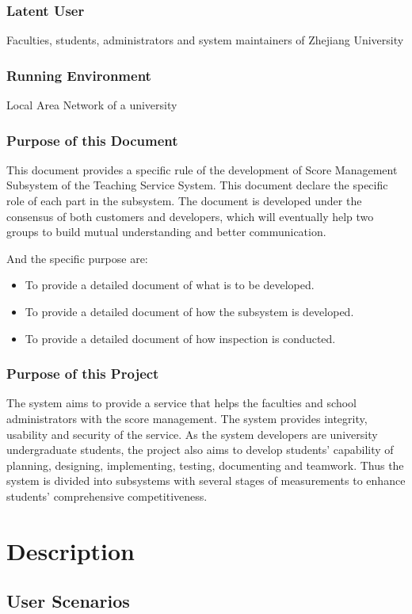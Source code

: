 \documentclass[a4]{article}
\begin{document}
\subsubsection{Latent User} 
Faculties, students, administrators and system maintainers of Zhejiang University
\subsubsection{Running Environment} 
Local Area Network of a university

\subsubsection{Purpose of this Document}
This document provides a specific rule of the development of Score Management Subsystem of the Teaching Service System. This document declare the specific role of each part in the subsystem.  The document is developed under the consensus of both customers and developers, which will eventually help two groups to build mutual understanding and better communication. 

And the specific purpose are:
\begin{itemize}
\item To provide a detailed document of what is to be developed.
\item To provide a detailed document of how the subsystem is developed.
\item To provide a detailed document of how inspection is conducted.
\end{itemize}
\subsubsection{Purpose of this Project}
The system aims to provide a service that helps the faculties and school administrators with the score management. The system provides integrity, usability and security of the service. As the system developers are university undergraduate students, the project also aims to develop students' capability of planning, designing, implementing, testing, documenting and teamwork. Thus the system is divided into subsystems with several stages of measurements to enhance students' comprehensive competitiveness.

\section{Description}

\subsection{User Scenarios}
\end{document}
